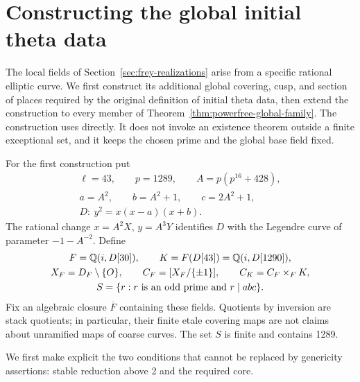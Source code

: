 \section{Constructing the global initial theta data}
\label{sec:initial-theta-data}

The local fields of Section~\ref{sec:frey-realizations} arise from a
specific rational elliptic curve. We first construct its additional
global covering, cusp, and section of places required by the original
definition of initial theta data, then extend the construction to
every member of Theorem~\ref{thm:powerfree-global-family}.
The construction uses
\cite[Definition~3.1(a)--(f)]{IUT1} directly. It does not invoke an
existence theorem outside a finite exceptional set, and it keeps the
chosen prime and the global base field fixed.

For the first construction put
\begin{equation}\label{eq:itd-curve}
 \begin{gathered}
  \ell=43,\qquad p=1289,\qquad A=p(p^{16}+428),\\
  a=A^2,\qquad b=A^2+1,\qquad c=2A^2+1,\\
  D:\ y^2=x(x-a)(x+b).
 \end{gathered}
\end{equation}
The rational change $x=A^2X$, $y=A^3Y$ identifies $D$ with the
Legendre curve of parameter $-1-A^{-2}$. Define
\begin{equation}\label{eq:itd-fields}
 \begin{gathered}
  F=\mathbb Q(i,D[30]),\qquad K=F(D[43])=\mathbb Q(i,D[1290]),\\
  X_F=D_F\setminus\{O\},\qquad
  C_F=[X_F/\{\pm1\}],\qquad C_K=C_F\times_FK,\\
  S=\{r:r\text{ is an odd prime and }r\mid abc\}.
 \end{gathered}
\end{equation}
Fix an algebraic closure $\overline F$ containing these fields.
Quotients by inversion are stack quotients; in particular, their
finite etale covering maps are not claims about unramified maps of
coarse curves. The set $S$ is finite and contains 1289.

We first make explicit the two conditions that cannot be replaced by
genericity assertions: stable reduction above 2 and the required core.

